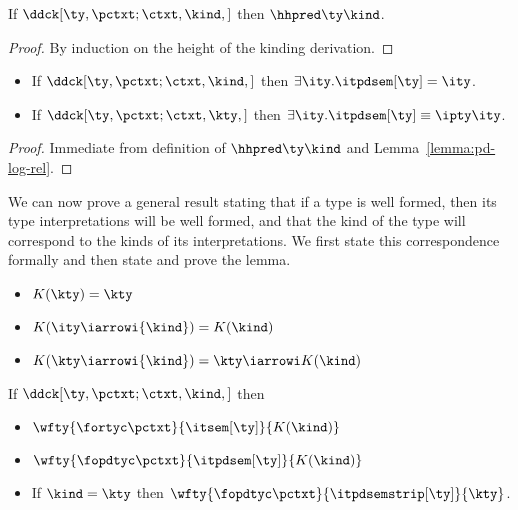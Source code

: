 \begin{lemma}
\label{lemma:pd-log-rel}
If $\ddck[\ty,{\pctxt;\ctxt},\kind,{}]$ then $\hhpred \ty \kind$.
\end{lemma}

\begin{proof}
  By induction on the height of the kinding derivation. 
\end{proof}

\begin{corollary}
\label{cor:pd-props}
  \begin{itemize}
  \item If $\ddck[\ty,\pctxt;\ctxt,\kind,{}]$ then $\exists
     \ity.\itpdsem[\ty] = \ity$.
   \item If $\ddck[\ty,\pctxt;\ctxt,\kty,{}]$ then $\exists
     \ity.\itpdsem[\ty] \equiv \ipty \ity$.
  \end{itemize}
\end{corollary}

\begin{proof}
  Immediate from definition of $\hhpred \ty \kind$ and
  Lemma~\ref{lemma:pd-log-rel}.
\end{proof}

We can now prove a general result stating that if a type is well
formed, then its type interpretations will be well formed, and that
the kind of the type will correspond to the kinds of its
interpretations. We first state this correspondence formally and then
state and prove the lemma.

\begin{definition}
\begin{itemize}
\item $K(\kty)        = \kty$
\item $K(\ity \iarrowi {\kind}) = K(\kind)$
\item $K(\kty \iarrowi {\kind}) = \kty \iarrowi K(\kind)$
\end{itemize}
\end{definition}

\begin{lemma}
If $\ddck[\ty,\pctxt;\ctxt,\kind,]$ then 
\begin{itemize}
\item $\wfty{\fortyc \pctxt}{\itsem[\ty]}{K(\kind)}$
\item $\wfty{\fopdtyc \pctxt}{\itpdsem[\ty]}{K(\kind)}$
\item If $\kind = \kty$ then $\wfty {\fopdtyc \pctxt}{\itpdsemstrip[\ty]}{\kty}$.
\end{itemize}
\label{lemma:rep-ty-well-form}
\end{lemma}

